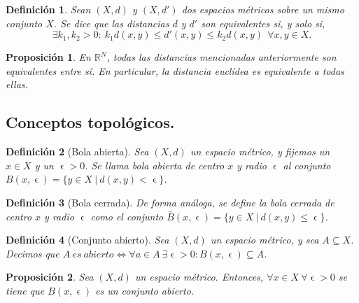 \documentclass[11pt, a4paper, titlepage]{article}
\let\epsilon\upvarepsilon
\theoremstyle{theorem-style}
\newtheorem*{nprop}{Proposición}
\theoremstyle{definition-style}
\newtheorem*{ndef}{Definición}
\theoremstyle{remark-style}
\theoremstyle{example-style}
\begin{document}
\begin{ndef}
Sean $(X,d)$ y $(X,d')$ dos espacios métricos sobre un mismo conjunto $X$. Se dice que las distancias $d$ y $d'$ son \textit{equivalentes} si, y solo si, $$\exists k_1,k_2 > 0 :\ k_1d(x,y)\le d'(x,y) \le k_2d(x,y)\ \ \forall x,y\in X.$$
\end{ndef}



\begin{nprop}
En $\mathbb{R}^N$, todas las distancias mencionadas anteriormente son equivalentes entre sí. En particular, la distancia euclídea es equivalente a todas ellas.
\end{nprop}


\subsection{Conceptos topológicos.} 

\begin{ndef}[Bola abierta]
Sea $(X,d)$ un espacio métrico, y fijemos un $x\in X$ y un $\epsilon > 0$. Se llama \emph{bola abierta de centro $x$ y radio $\epsilon$} al conjunto $B(x,\epsilon) = \{ y\in X \ | \ d(x,y)<\epsilon\}$.
\end{ndef}



\begin{ndef}[Bola cerrada]
De forma análoga, se define la \emph{bola cerrada de centro $x$ y radio $\epsilon$} como el conjunto $\bar{B}(x,\epsilon) = \{y\in X \ | \ d(x,y)\leq \epsilon \}$.
\end{ndef}



\begin{ndef}[Conjunto abierto]
Sea $(X,d)$ un espacio métrico, y sea $A\subseteq X$. Decimos que \mbox{$A\ es\ abierto \iff \forall a \in A\ \exists \epsilon > 0: B(x,\epsilon) \subseteq A$}.	
\end{ndef}



\begin{nprop}
Sea $(X,d)$ un espacio métrico. Entonces, $\forall x \in X \ \forall \epsilon > 0$ se tiene que $B(x,\epsilon)$ es un conjunto abierto.
\end{nprop}
\end{document}

